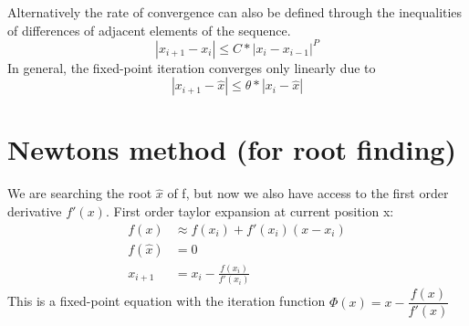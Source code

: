 Alternatively the rate of convergence can also be defined through the inequalities of differences of adjacent elements of the sequence.
\begin{equation*}
    |x_{i+1}-x_i| \leq C * |x_i-x_{i-1}|^P
\end{equation*}
In general, the fixed-point iteration converges only linearly due to
\begin{equation*}
    |x_{i+1}-\hat{x}| \leq \theta * |x_i-\hat{x}|
\end{equation*}


\section{Newtons method (for root finding)}\label{sec:newtons-method-(for-root-finding)}
We are searching the root $\hat{x}$ of f, but now we also have access to the first order derivative $f'(x)$.
First order taylor expansion at current position x:
\begin{align*}
    f(x) &\approx f(x_i)+ f'(x_i)(x-x_i)\\
    f(\hat{x}) &= 0\\
    x_{i+1} &= x_i - \frac{f(x_i)}{f'(x_i)}
\end{align*}
This is a fixed-point equation with the iteration function $\Phi(x)= x - \dfrac{f(x)}{f'(x)}$
